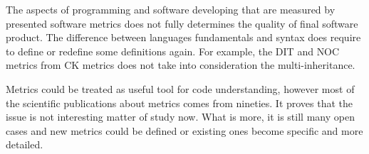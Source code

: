 The aspects of programming and software developing that are measured by presented software metrics does not fully determines the quality of final software product. The difference between languages fundamentals and syntax does require to define or redefine some definitions again. For example, the \ac{DIT} and \ac{NOC} metrics from \ac{CK metrics} does not take into consideration the multi-inheritance.   

Metrics could be treated as useful tool for code understanding, however most of the scientific publications about metrics comes from nineties. It proves that the issue is not interesting matter of study now. What is more, it is still many open cases and new metrics could be defined or existing ones become specific and more detailed.